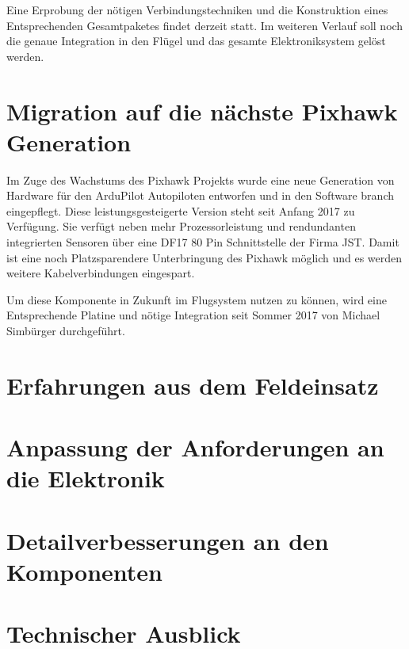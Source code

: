 Eine Erprobung der nötigen Verbindungstechniken und die Konstruktion eines Entsprechenden Gesamtpaketes findet derzeit statt.
Im weiteren Verlauf soll noch die genaue Integration in den Flügel und das gesamte Elektroniksystem gelöst werden.

\section{Migration auf die nächste Pixhawk Generation}

Im Zuge des Wachstums des Pixhawk Projekts wurde eine neue Generation von Hardware für den ArduPilot Autopiloten entworfen und in den Software branch eingepflegt. Diese leistungsgesteigerte Version steht seit Anfang 2017 zu Verfügung.
Sie verfügt neben mehr Prozessorleistung und rendundanten integrierten Sensoren über eine DF17 80 Pin Schnittstelle der Firma JST. Damit ist eine noch Platzsparendere Unterbringung des Pixhawk möglich und es werden weitere Kabelverbindungen eingespart.

Um diese Komponente in Zukunft im Flugsystem nutzen zu können, wird eine Entsprechende Platine und nötige Integration seit Sommer 2017 von Michael Simbürger durchgeführt.

\section{Erfahrungen aus dem Feldeinsatz}

\section{Anpassung der Anforderungen an die Elektronik}

\section{Detailverbesserungen an den Komponenten}

\section{Technischer Ausblick}